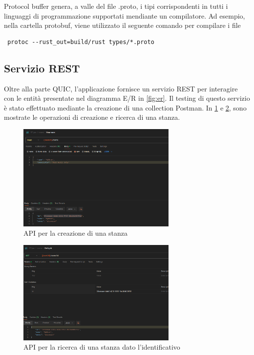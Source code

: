 \documentclass{article}
\begin{document}


Protocol buffer genera, a valle del file .proto, i tipi corrispondenti in tutti i linguaggi 
di programmazione supportati mendiante un compilatore. Ad esempio, nella cartella protobuf,
viene utilizzato il seguente comando per compilare i file 
\begin{verbatim}
 protoc --rust_out=build/rust types/*.proto 
\end{verbatim}

\subsection{Servizio REST}
Oltre alla parte QUIC, l'applicazione fornisce un servizio REST per interagire con le entità 
presentate nel diagramma E/R in \cref{fig:er}. Il 
testing di questo servizio è stato effettuato mediante la creazione di una collection 
Postman. In \cref{fig:create-room} e 
\cref{fig:get-room}, 
sono mostrate le operazioni di creazione e ricerca di una stanza. 


\begin{figure}[h]
  \centering
  \includegraphics[width=0.7\textwidth]{figures/create_room.png}
  \caption{API per la creazione di una stanza}
  \label{fig:create-room}
\end{figure}

\begin{figure}[hh]
  \centering
  \includegraphics[width=0.7\textwidth]{figures/get_room.png}
  \caption{API per la ricerca di una stanza dato l'identificativo}
  \label{fig:get-room}
\end{figure}
\end{document}
